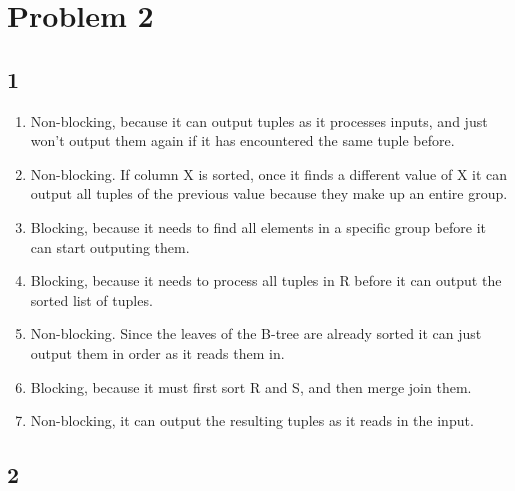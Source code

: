 \documentclass[a4paper, 12pt]{article}
\begin{document}
\section*{Problem 2}

\subsection*{1}

\begin{enumerate}[label=(\alph*)]
	\item Non-blocking, because it can output tuples as it processes inputs, and
		just won't output them again if it has encountered the same tuple
		before.
	\item Non-blocking. If column X is sorted, once it finds a different value
		of X it can output all tuples of the previous value because they make up
		an entire group.
	\item Blocking, because it needs to find all elements in a specific group
		before it can start outputing them.
	\item Blocking, because it needs to process all tuples in R before it can
		output the sorted list of tuples.
	\item Non-blocking. Since the leaves of the B-tree are already sorted it can
		just output them in order as it reads them in.
	\item Blocking, because it must first sort R and S, and then merge join
		them.
	\item Non-blocking, it can output the resulting tuples as it reads in the
		input.
\end{enumerate}

\subsection*{2}
\end{document}
